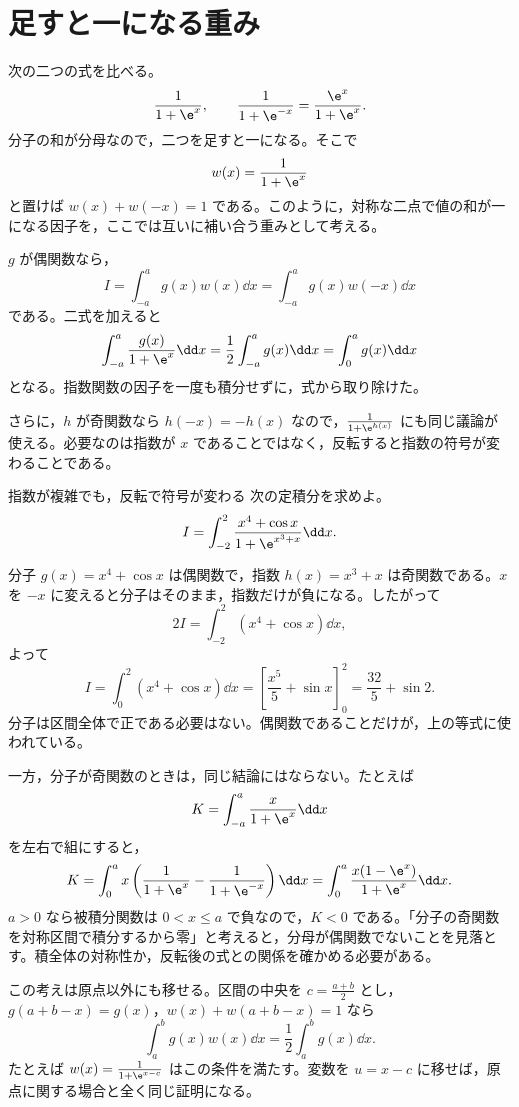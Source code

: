 \section{足すと一になる重み}\label{節:相補重み}

次の二つの式を比べる。
\[
\frac{1}{1+\e^x},\qquad
\frac{1}{1+\e^{-x}}=\frac{\e^x}{1+\e^x}.
\]
分子の和が分母なので，二つを足すと一になる。そこで
\[
w(x)=\frac{1}{1+\e^x}
\]
と置けば $w(x)+w(-x)=1$ である。このように，対称な二点で値の和が一になる因子を，ここでは互いに補い合う重みとして考える。

$g$ が偶関数なら，
\[
I=\int_{-a}^a g(x)w(x)\dd x
 =\int_{-a}^a g(x)w(-x)\dd x
\]
である。二式を加えると
\begin{equation}\label{式:偶関数と相補重み}
\int_{-a}^a\frac{g(x)}{1+\e^x}\dd x
 =\frac12\int_{-a}^a g(x)\dd x
 =\int_0^a g(x)\dd x
\end{equation}
となる。指数関数の因子を一度も積分せずに，式から取り除けた。

さらに，$h$ が奇関数なら $h(-x)=-h(x)$ なので，$\frac{1}{1+\e^{h(x)}}$ にも同じ議論が使える。必要なのは指数が $x$ であることではなく，反転すると指数の符号が変わることである。

\begin{example}{指数が複雑でも，反転で符号が変わる}
次の定積分を求めよ。
\[
I=\int_{-2}^2\frac{x^4+\cos x}{1+\e^{x^3+x}}\dd x.
\]
\end{example}

分子 $g(x)=x^4+\cos x$ は偶関数で，指数 $h(x)=x^3+x$ は奇関数である。$x$ を $-x$ に変えると分子はそのまま，指数だけが負になる。したがって
\[
2I=\int_{-2}^2(x^4+\cos x)\dd x,
\]
よって
\[
I=\int_0^2(x^4+\cos x)\dd x
 =\left[\frac{x^5}{5}+\sin x\right]_0^2
 =\frac{32}{5}+\sin2.
\]
分子は区間全体で正である必要はない。偶関数であることだけが，上の等式に使われている。

一方，分子が奇関数のときは，同じ結論にはならない。たとえば
\[
K=\int_{-a}^a\frac{x}{1+\e^x}\dd x
\]
を左右で組にすると，
\[
K=\int_0^a x\left(\frac{1}{1+\e^x}-\frac{1}{1+\e^{-x}}\right)\dd x
 =\int_0^a\frac{x(1-\e^x)}{1+\e^x}\dd x.
\]
$a>0$ なら被積分関数は $0<x\leq a$ で負なので，$K<0$ である。「分子の奇関数を対称区間で積分するから零」と考えると，分母が偶関数でないことを見落とす。積全体の対称性か，反転後の式との関係を確かめる必要がある。

この考えは原点以外にも移せる。区間の中央を $c=\frac{a+b}{2}$ とし，$g(a+b-x)=g(x)$，$w(x)+w(a+b-x)=1$ なら
\[
\int_a^b g(x)w(x)\dd x=\frac12\int_a^b g(x)\dd x.
\]
たとえば $w(x)=\frac{1}{1+\e^{x-c}}$ はこの条件を満たす。変数を $u=x-c$ に移せば，原点に関する場合と全く同じ証明になる。

